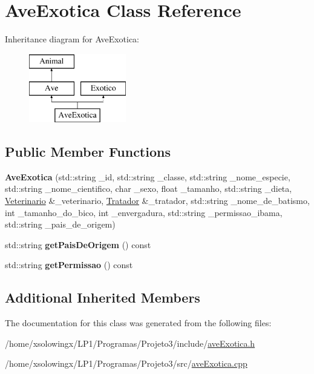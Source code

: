 \hypertarget{classAveExotica}{}\section{Ave\+Exotica Class Reference}
\label{classAveExotica}
Inheritance diagram for Ave\+Exotica\+:\begin{figure}[H]
\begin{center}
\leavevmode
\includegraphics[height=3.000000cm]{classAveExotica}
\end{center}
\end{figure}
\subsection*{Public Member Functions}
\begin{DoxyCompactItemize}
\item 
\mbox{\label{classAveExotica_aecd13c8d769ad45e46fb3393a7832997}} 
{\bfseries Ave\+Exotica} (std\+::string \+\_\+id, std\+::string \+\_\+classe, std\+::string \+\_\+nome\+\_\+especie, std\+::string \+\_\+nome\+\_\+cientifico, char \+\_\+sexo, float \+\_\+tamanho, std\+::string \+\_\+dieta, \hyperlink{classVeterinario}{Veterinario} \&\+\_\+veterinario, \hyperlink{classTratador}{Tratador} \&\+\_\+tratador, std\+::string \+\_\+nome\+\_\+de\+\_\+batismo, int \+\_\+tamanho\+\_\+do\+\_\+bico, int \+\_\+envergadura, std\+::string \+\_\+permissao\+\_\+ibama, std\+::string \+\_\+pais\+\_\+de\+\_\+origem)
\item 
\mbox{\label{classAveExotica_adccbd74661ee6f633e79229ae6e0bf5b}} 
std\+::string {\bfseries get\+Pais\+De\+Origem} () const
\item 
\mbox{\label{classAveExotica_a8c6fbe0ed75a48003087db98525664d1}} 
std\+::string {\bfseries get\+Permissao} () const
\end{DoxyCompactItemize}
\subsection*{Additional Inherited Members}


The documentation for this class was generated from the following files\+:\begin{DoxyCompactItemize}
\item 
/home/xsolowingx/\+L\+P1/\+Programas/\+Projeto3/include/\hyperlink{aveExotica_8h}{ave\+Exotica.\+h}\item 
/home/xsolowingx/\+L\+P1/\+Programas/\+Projeto3/src/\hyperlink{aveExotica_8cpp}{ave\+Exotica.\+cpp}\end{DoxyCompactItemize}
